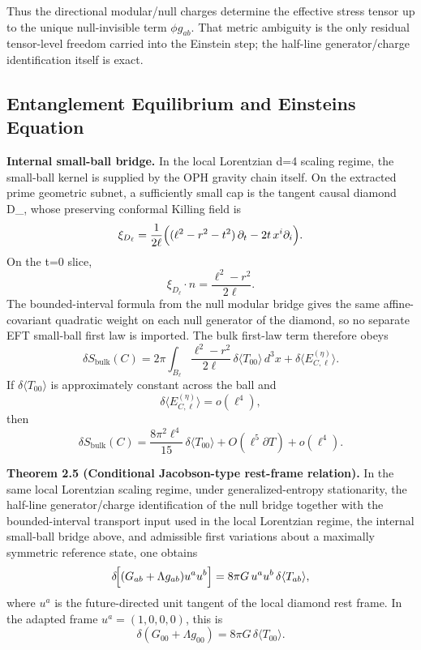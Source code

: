 Thus the directional modular/null charges determine the effective stress tensor up to the unique null-invisible term \(\phi g_{ab}\). That metric ambiguity is the only residual tensor-level freedom carried into the Einstein step; the half-line generator/charge identification itself is exact.

\subsection{Entanglement Equilibrium and Einstein\textquotesingle s Equation}\label{25-entanglement-equilibrium-and-einsteins-equation}

\textbf{Internal small-ball bridge.} In the local Lorentzian d=4 scaling regime, the small-ball kernel is supplied by the OPH gravity chain itself. On the extracted prime geometric subnet, a sufficiently small cap is the tangent causal diamond D_\ell, whose preserving conformal Killing field is
\[
\xi_{D_\ell}
=
\frac{1}{2\ell}
\Bigl((\ell^2-r^2-t^2)\,\partial_t-2t\,x^i\partial_i\Bigr).
\]
On the t=0 slice,
\[
\xi_{D_\ell}\!\cdot n=\frac{\ell^2-r^2}{2\ell}.
\]
The bounded-interval formula from the null modular bridge gives the same affine-covariant quadratic weight on each null generator of the diamond, so no separate EFT small-ball first law is imported. The bulk first-law term therefore obeys
\[
\delta S_{\mathrm{bulk}}(C)
=
2\pi\int_{B_\ell}\frac{\ell^2-r^2}{2\ell}\,\delta\langle T_{00}\rangle\,d^3x
+
\delta\langle E^{(\eta)}_{C,\ell}\rangle.
\]
If \(\delta\langle T_{00}\rangle\) is approximately constant across the ball and
\[
\delta\langle E^{(\eta)}_{C,\ell}\rangle=o(\ell^4),
\]
then
\[
\delta S_{\mathrm{bulk}}(C)
=
\frac{8\pi^2\ell^4}{15}\,\delta\langle T_{00}\rangle
+O(\ell^5\partial T)+o(\ell^4).
\]

\textbf{Theorem 2.5 (Conditional Jacobson-type rest-frame relation).} In the same local Lorentzian scaling regime, under generalized-entropy stationarity, the half-line generator/charge identification of the null bridge together with the bounded-interval transport input used in the local Lorentzian regime, the internal small-ball bridge above, and admissible first variations about a maximally symmetric reference state, one obtains
\[
\delta\!\Bigl[(G_{ab}+\Lambda g_{ab})u^a u^b\Bigr]
=
8\pi G\,u^a u^b\,\delta\langle T_{ab}\rangle,
\]
where \(u^a\) is the future-directed unit tangent of the local diamond rest frame. In the adapted frame \(u^a=(1,0,0,0)\), this is
\[
\delta\!\left(G_{00}+\Lambda g_{00}\right)=8\pi G\,\delta\langle T_{00}\rangle.
\]

